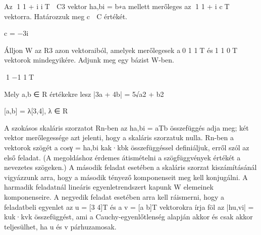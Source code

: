 \begin{frame}
  \begin{tcolorbox}[title={10/2. -R-}]
    Az 1 1 + i iT ∈ C3 vektor ha,bi = b∗a mellett merőleges az 1 1 + i cT vektorra. Határozzuk meg c ∈ C értékét.


  \tcblower

    \mmedskip 
    
    c = −3i
  \end{tcolorbox}
\end{frame}


\begin{frame}
  \begin{tcolorbox}[title={10/3. -R-}]
    Álljon W az R3 azon vektoraiból, amelyek merőlegesek a0 1 1T és1 1 0T vektorok mindegyikére. Adjunk meg egy bázist W-ben.

  \tcblower

    \mmedskip 
    
    {1 −1 1T}
  \end{tcolorbox}
\end{frame}


\begin{frame}
  \begin{tcolorbox}[title={10/4. -Q-}]
    Mely a,b ∈ R értékekre lesz |3a + 4b| = 5√a2 + b2

  \tcblower

    \mmedskip 
    
    [a,b] = λ[3,4], λ ∈ R
  \end{tcolorbox}
\end{frame}


\begin{frame}
  \begin{tcolorbox}[title={10/4. -Q-}]
    A szokásos skaláris szorzatot Rn-ben az ha,bi = aTb összefüggés adja meg; két vektor merőlegessége azt jelenti, hogy a skaláris szorzatuk nulla. Rn-ben a vektorok szögét a cosγ = ha,bi kak·kbk összefüggéssel deﬁniáljuk, erről szól az első feladat. (A megoldáshoz érdemes átismételni a szögfüggvények értékét a nevezetes szögeken.) A második feladat esetében a skaláris szorzat kiszámításánál vigyázzunk arra, hogy a második tényező komponenseit meg kell konjugálni. A harmadik feladatnál lineáris egyenletrendszert kapunk W elemeinek komponenseire. A negyedik feladat esetében arra kell ráismerni, hogy a feladatbeli egyenlet az u = [3 4]T és a v = [a b]T vektorokra írja föl az |hu,vi| = kuk·kvk összefüggést, ami a Cauchy-egyenlőtlenség alapján akkor és csak akkor teljesülhet, ha u és v párhuzamosak.
  \end{tcolorbox}
\end{frame}


